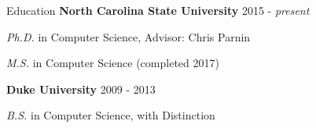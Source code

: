 \documentclass{resume} %
\begin{document}
\vspace{-14pt}
\begin{rSection}{Education}
\vspace{-4pt}
{\bf North Carolina State University} \hfill {2015 - \textit{present}} 

\vspace{-9pt}
\textit{Ph.D.} in Computer Science,  Advisor: Chris Parnin 

\vspace{-9pt}
\textit{M.S.} in Computer Science (completed 2017)
\vspace{-6pt}

{\bf Duke University} \hfill {2009 - 2013}

\vspace{-9pt}
\textit{B.S.} in Computer Science, with Distinction
\end{rSection}
\vspace{-12pt}
\end{document}
